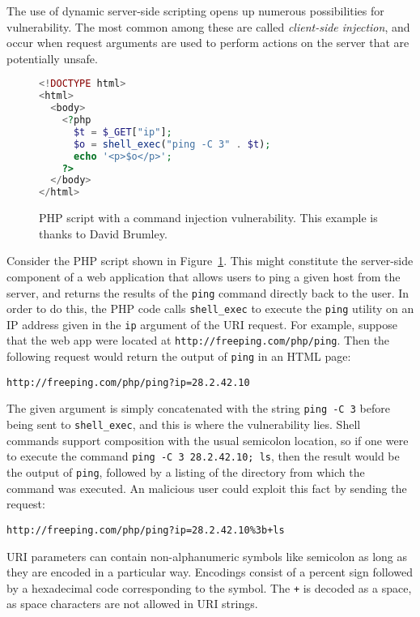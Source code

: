 \documentclass[11pt,twoside]{scrartcl}
\begin{document}
The use of dynamic server-side scripting opens up numerous possibilities for vulnerability. The most common among these are called \emph{client-side injection}, and occur when request arguments are used to perform actions on the server that are potentially unsafe. 

\begin{figure}
\begin{lstlisting}[language=PHP]
<!DOCTYPE html>
<html>
  <body>
    <?php 
      $t = $_GET["ip"];
      $o = shell_exec("ping -C 3" . $t);
      echo '<p>$o</p>'; 
    ?>
  </body>
</html>
\end{lstlisting}

\caption{\label{fig:injection1} PHP script with a command injection vulnerability. This example is thanks to David Brumley.}
\end{figure}

Consider the PHP script shown in Figure~\ref{fig:injection1}. This might constitute the server-side component of a web application that allows users to ping a given host from the server, and returns the results of the \verb'ping' command directly back to the user. In order to do this, the PHP code calls \verb'shell_exec' to execute the \verb'ping' utility on an IP address given in the \verb'ip' argument of the URI request. For example, suppose that the web app were located at \nolinkurl{http://freeping.com/php/ping}. Then the following request would return the output of \verb'ping' in an HTML page:
\begin{verbatim}
http://freeping.com/php/ping?ip=28.2.42.10
\end{verbatim}
The given argument is simply concatenated with the string \verb'ping -C 3' before being sent to \verb'shell_exec', and this is where the vulnerability lies. Shell commands support composition with the usual semicolon location, so if one were to execute the command \verb'ping -C 3 28.2.42.10; ls', then the result would be the output of \verb'ping', followed by a listing of the directory from which the command was executed. An malicious user could exploit this fact by sending the request:
\begin{verbatim}
http://freeping.com/php/ping?ip=28.2.42.10%3b+ls
\end{verbatim}
URI parameters can contain non-alphanumeric symbols like semicolon as long as they are encoded in a particular way. Encodings consist of a percent sign followed by a hexadecimal code corresponding to the symbol. The \verb'+' is decoded as a space, as space characters are not allowed in URI strings. 
\end{document}
